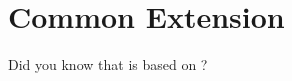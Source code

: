 
\chapter{\label{common-extension}Common Extension}
\par Did you know that \href{https:://mooseframework.org}{} is based on \href{https://libmesh.github.io/}{}? 